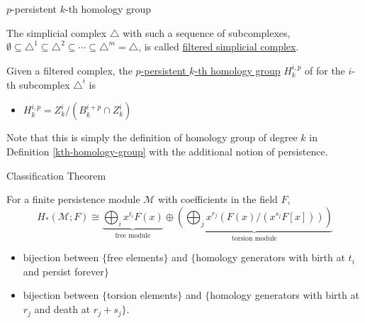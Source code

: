 \documentclass[xcolor={dvipsnames,svgnames}]{beamer}
\begin{document}
\begin{frame}{$p$-persistent $k$-th homology group}
\begin{defn}
\label{filtered}
The simplicial complex $\triangle$ with such a sequence of subcomplexes, $\emptyset \subseteq \triangle^1 \subseteq \triangle^2 \subseteq \cdots \subseteq \triangle^m = \triangle$, is called \underline{filtered simplicial complex}.
\end{defn}
\begin{defn}
Given a filtered complex, the \underline{$p$-persistent $k$-th homology group} $H_k^{i,p}$ of for the $i$-th subcomplex $\triangle^i$ is 
\begin{itemize}
    \item $H_k^{i,p} = Z_k^i / (B_k^{i+p}\cap Z_k^i)$
\end{itemize}
\end{defn}
Note that this is simply the definition of homology group of degree $k$ in Definition \ref{kth-homology-group} with the additional notion of persistence.
\end{frame}

\begin{frame}{Classification Theorem}

\begin{thm}
    For a finite persistence module $\mathscr{M}$ with coefficients in the field $F$, 
    \begin{equation}
        H_*(\mathscr{M}; F) \cong \underbrace{\bigoplus_i x^{t_i}F(x)}_\text{free module} \oplus  \underbrace{\left(\bigoplus_j x^{r_j}(F(x)/(x^{s_j}F[x]))\right)}_\text{torsion module}
    \end{equation}
    \end{thm}
    
    \begin{itemize}
        \item bijection between $\{$free elements$\}$ and $\{$homology generators with birth at $t_i$ and persist forever$\}$
       
       \item bijection between $\{$torsion elements$\}$  and  $\{$homology generators with birth at $r_j$ and death at $r_j + s_j\}$.
    \end{itemize}
\end{frame}
\end{document}
